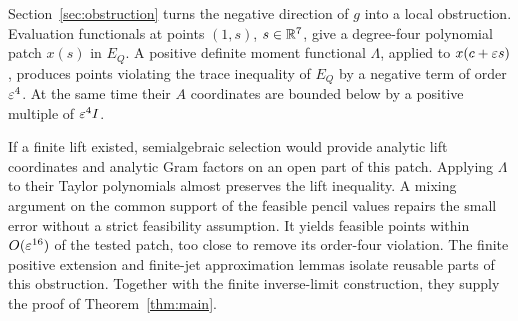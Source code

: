 Section~\ref{sec:obstruction} turns the negative direction of $g$
into a local obstruction. Evaluation functionals at points $(1,s)$,
$s\in\mathbb R^7$, give a degree-four polynomial patch $x(s)$ in $E_Q$.
A positive definite moment functional $\Lambda$, applied to
$x(c+\varepsilon s)$, produces points violating the trace inequality of
$E_Q$ by a negative term of order $\varepsilon^4$. At the same time their
$A$ coordinates are bounded below by a positive multiple of
$\varepsilon^4 I$.

If a finite lift existed, semialgebraic selection would provide analytic
lift coordinates and analytic Gram factors on an open part of this
patch. Applying $\Lambda$ to their Taylor polynomials almost preserves
the lift inequality. A mixing argument on the common support of the
feasible pencil values repairs the small error without a strict
feasibility assumption. It yields feasible points within
$O(\varepsilon^{16})$ of the tested patch, too close to remove its order-four
violation. The finite positive extension and finite-jet approximation
lemmas isolate reusable parts of this obstruction. Together with the
finite inverse-limit construction, they supply the proof of
Theorem~\ref{thm:main}.
